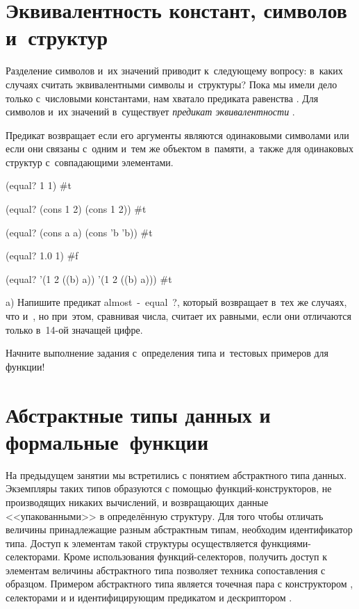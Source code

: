 \section[4]{Эквивалентность констант, символов и~структур}%
Разделение символов и~их значений приводит к~следующему вопросу: в~каких случаях считать эквивалентными символы и~структуры? Пока мы имели дело только с~числовыми константами, нам хватало предиката равенства \s{=}. Для символов и~их значений в~\Scheme существует \emph{предикат эквивалентности} .

Предикат  возвращает  если его аргументы являются одинаковыми символами или если они связаны с~одним и~тем же объектом в~памяти, а~также для одинаковых структур с~совпадающими элементами.

\REPL
  {(equal? 1 1)}
  {\#t}

\REPL
  {(equal? (cons 1 2) (cons 1 2))}
  {\#t}

\REPL
  {(equal? (cons a a) (cons 'b 'b))}
  {\#t}

\REPL
  {(equal? 1.0 1)}
  {\#f}

\REPL
  {(equal? '(1 2 ((b) a)) '(1 2 ((b) a)))}
  {\#t} 

\begin{Assignment}
a) Напишите предикат \si{almost-equal?}, который возвращает  в~тех же случаях, что и~, но при~этом, сравнивая числа, считает их равными, если они отличаются только в~14-ой значащей цифре.

\begin{Tip}
Начните выполнение задания с~определения типа и~тестовых примеров для функции!
\end{Tip}

\end{Assignment}


\section[4]{Абстрактные типы данных и формальные~функции}%
%
На предыдущем занятии мы встретились с понятием абстрактного типа данных. Экземпляры таких типов образуются с помощью функций-конструкторов, не производящих никаких вычислений, и возвращающих данные <<упакованными>> в определённую структуру. Для того чтобы отличать величины принадлежащие разным абстрактным типам, необходим идентификатор типа. Доступ к элементам такой структуры осуществляется функциями-селекторами. Кроме использования функций-селекторов, получить доступ к элементам величины абстрактного типа позволяет техника сопоставления с образцом. Примером абстрактного типа является точечная пара с конструктором , селекторами  и  и идентифицирующим предикатом  и дескриптором .


